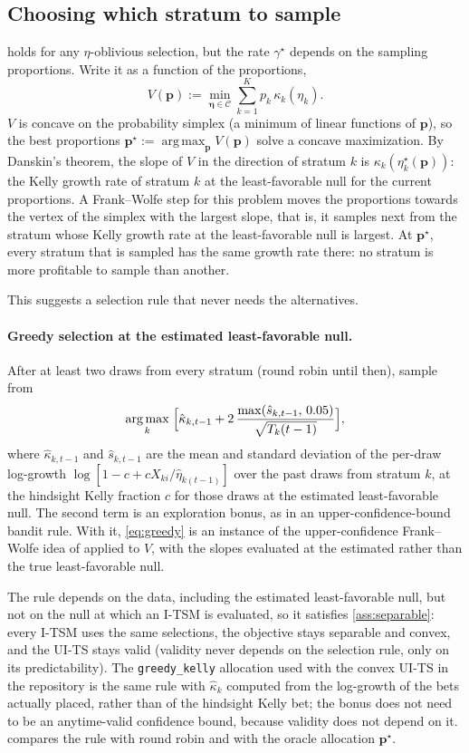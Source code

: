\documentclass[11pt]{article}
\newcommand{\bs}{\boldsymbol}
\newcommand{\calC}{\mathcal{C}}
\DeclareMathOperator*{\argmax}{arg\,max}
\theoremstyle{plain}
\theoremstyle{definition}
\theoremstyle{remark}
\begin{document}
\subsection{Choosing which stratum to sample}\label{sec:selection}

 holds for any $\eta$-oblivious selection, but the rate $\gamma^\star$ depends on the sampling
proportions.  Write it as a function of the proportions,
\[
V(\bs p) := \min_{\bs\eta\in\calC}\sum_{k=1}^Kp_k\,\kappa_k(\eta_k).
\]
$V$ is concave on the probability simplex (a minimum of linear functions of $\bs p$), so the best proportions
$\bs p^\star:=\argmax_{\bs p}V(\bs p)$ solve a concave maximization.  By Danskin's theorem, the slope of $V$ in the direction
of stratum $k$ is $\kappa_k(\eta^\star_k(\bs p))$: the Kelly growth rate of stratum $k$ at the least-favorable null for the
current proportions.  A Frank--Wolfe step for this problem \citep{frank1956algorithm} moves the proportions towards the
vertex of the simplex with the largest slope, that is, it samples next from the stratum whose Kelly growth rate at the
least-favorable null is largest.  At $\bs p^\star$, every stratum that is sampled has the same growth rate there: no stratum
is more profitable to sample than another.

This suggests a selection rule that never needs the alternatives.

\paragraph{Greedy selection at the estimated least-favorable null.}  After at least two draws from every stratum
(round robin until then), sample from
\begin{equation}\label{eq:greedy}
\argmax_k\;\Bigl[\hat\kappa_{k,t-1}+2\,\frac{\max(\hat s_{k,t-1},\,0.05)}{\sqrt{T_k(t-1)}}\Bigr],
\end{equation}
where $\hat\kappa_{k,t-1}$ and $\hat s_{k,t-1}$ are the mean and standard deviation of the per-draw log-growth
$\log[1-c+cX_{ki}/\hat\eta_{k(t-1)}]$ over the past draws from stratum $k$, at the hindsight Kelly fraction $c$ for those
draws at the estimated least-favorable null.  The second term is an exploration bonus, as in an upper-confidence-bound
bandit rule.  With it, \eqref{eq:greedy} is an instance of the upper-confidence Frank--Wolfe idea of
\citet{berthet2017fast} applied to $V$, with the slopes evaluated at the estimated rather than the true least-favorable
null.

The rule depends on the data, including the estimated least-favorable null, but not on the null at which an I-TSM is
evaluated, so it satisfies \cref{ass:separable}: every I-TSM uses the same selections, the objective stays separable and
convex, and the UI-TS stays valid (validity never depends on the selection rule, only on its predictability).  The
\texttt{greedy\_kelly} allocation used with the convex UI-TS in the repository is the same rule with $\hat\kappa_k$ computed
from the log-growth of the bets actually placed, rather than of the hindsight Kelly bet; the bonus does not need to be
an anytime-valid confidence bound, because validity does not depend on it.   compares the rule with round
robin and with the oracle allocation $\bs p^\star$.
\end{document}
